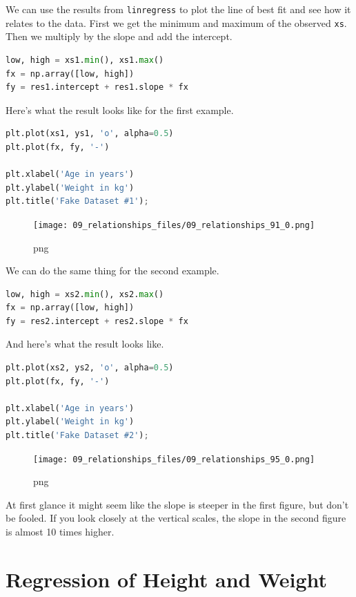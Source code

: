 \documentclass[
]{book}
\newcommand{\passthrough}[1]{#1}
\begin{document}
We can use the results from \passthrough{\lstinline!linregress!} to plot
the line of best fit and see how it relates to the data. First we get
the minimum and maximum of the observed \passthrough{\lstinline!xs!}.
Then we multiply by the slope and add the intercept.

\begin{lstlisting}[language=Python]
low, high = xs1.min(), xs1.max()
fx = np.array([low, high])
fy = res1.intercept + res1.slope * fx
\end{lstlisting}

Here's what the result looks like for the first example.

\begin{lstlisting}[language=Python]
plt.plot(xs1, ys1, 'o', alpha=0.5)
plt.plot(fx, fy, '-')

plt.xlabel('Age in years')
plt.ylabel('Weight in kg')
plt.title('Fake Dataset #1');
\end{lstlisting}

\begin{figure}
\centering
\texttt{[image: 09\_relationships\_files/09\_relationships\_91\_0.png]}
\caption{png}
\end{figure}

We can do the same thing for the second example.

\begin{lstlisting}[language=Python]
low, high = xs2.min(), xs2.max()
fx = np.array([low, high])
fy = res2.intercept + res2.slope * fx
\end{lstlisting}

And here's what the result looks like.

\begin{lstlisting}[language=Python]
plt.plot(xs2, ys2, 'o', alpha=0.5)
plt.plot(fx, fy, '-')

plt.xlabel('Age in years')
plt.ylabel('Weight in kg')
plt.title('Fake Dataset #2');
\end{lstlisting}

\begin{figure}
\centering
\texttt{[image: 09\_relationships\_files/09\_relationships\_95\_0.png]}
\caption{png}
\end{figure}

At first glance it might seem like the slope is steeper in the first
figure, but don't be fooled. If you look closely at the vertical scales,
the slope in the second figure is almost 10 times higher.

\section{Regression of Height and
Weight}\label{regression-of-height-and-weight}
\end{document}
